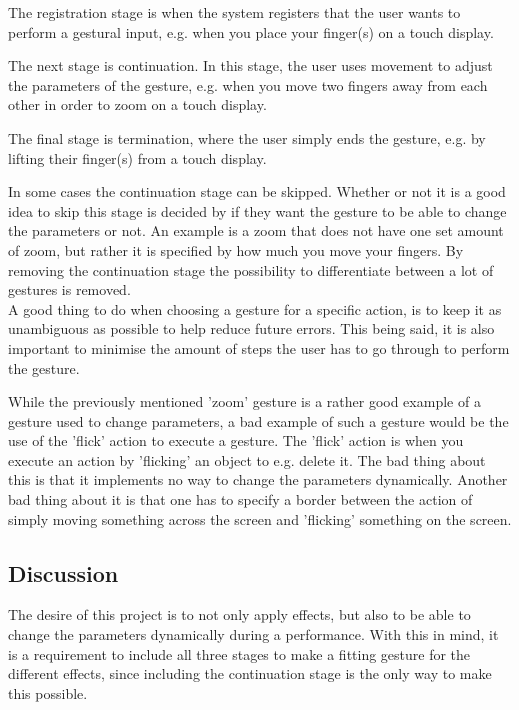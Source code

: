 The registration stage is when the system registers that the user wants to perform a gestural input, e.g. when you place your finger(s) on a touch display. 

The next stage is continuation. In this stage, the user uses movement to adjust the parameters of the gesture, e.g. when you move two fingers away from each other in order to zoom on a touch display.

The final stage is termination, where the user simply ends the gesture, e.g. by lifting their finger(s) from a touch display.

In some cases the continuation stage can be skipped. Whether or not it is a good idea to skip this stage is decided by if they want the gesture to be able to change the parameters or not. An example is a zoom that does not have one set amount of zoom, but rather it is specified by how much you move your fingers. By removing the continuation stage the possibility to differentiate between a lot of gestures is removed. \\

A good thing to do when choosing a gesture for a specific action, is to keep it as unambiguous as possible to help reduce future errors. This being said, it is also important to minimise the amount of steps the user has to go through to perform the gesture.

While the previously mentioned 'zoom' gesture is a rather good example of a gesture used to change parameters, a bad example of such a gesture would be the use of the 'flick' action to execute a gesture. The 'flick' action is when you execute an action by 'flicking' an object to e.g. delete it. The bad thing about this is that it implements no way to change the parameters dynamically. Another bad thing about it is that one has to specify a border between the action of simply moving something across the screen and 'flicking' something on the screen.

\subsection{Discussion}

The desire of this project is to not only apply effects, but also to be able to change the parameters dynamically during a performance. With this in mind, it is a requirement to include all three stages to make a fitting gesture for the different effects, since including the continuation stage is the only way to make this possible.


